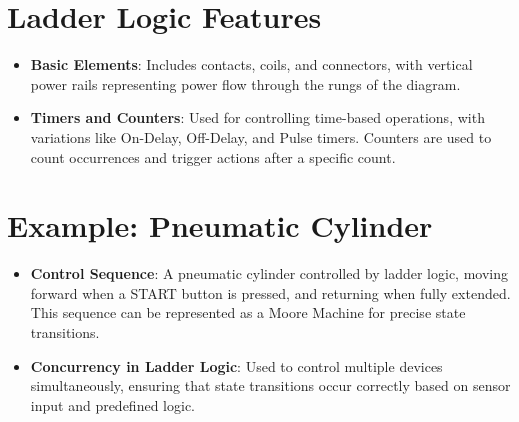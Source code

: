 \documentclass[
  14pt,
  a4paper,
  DIV=11,
  numbers=noendperiod,
  headinclude=true,
  footinclude=true]{scrreprt}
\providecommand{\tightlist}{%
  \setlength{\itemsep}{0pt}\setlength{\parskip}{0pt}}\usepackage{longtable,booktabs,array}
\begin{document}
\section{Ladder Logic Features}\label{ladder-logic-features}

\begin{itemize}
\tightlist
\item
  \textbf{Basic Elements}: Includes contacts, coils, and connectors,
  with vertical power rails representing power flow through the rungs of
  the diagram.
\item
  \textbf{Timers and Counters}: Used for controlling time-based
  operations, with variations like On-Delay, Off-Delay, and Pulse
  timers. Counters are used to count occurrences and trigger actions
  after a specific count.
\end{itemize}

\section{Example: Pneumatic Cylinder}\label{example-pneumatic-cylinder}

\begin{itemize}
\tightlist
\item
  \textbf{Control Sequence}: A pneumatic cylinder controlled by ladder
  logic, moving forward when a START button is pressed, and returning
  when fully extended. This sequence can be represented as a Moore
  Machine for precise state transitions.
\item
  \textbf{Concurrency in Ladder Logic}: Used to control multiple devices
  simultaneously, ensuring that state transitions occur correctly based
  on sensor input and predefined logic.
\end{itemize}
\end{document}
